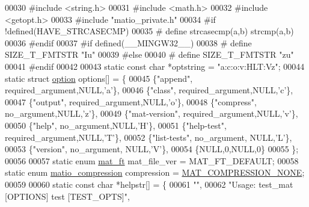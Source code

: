 \begin{DoxyCode}
00030 \textcolor{preprocessor}{#include <string.h>}
00031 \textcolor{preprocessor}{#include <math.h>}
00032 \textcolor{preprocessor}{#include <getopt.h>}
00033 \textcolor{preprocessor}{#include "matio\_private.h"}
00034 \textcolor{preprocessor}{#if !defined(HAVE\_STRCASECMP)}
00035 \textcolor{preprocessor}{#   define strcasecmp(a,b) strcmp(a,b)}
00036 \textcolor{preprocessor}{#endif}
00037 \textcolor{preprocessor}{#if defined(\_\_MINGW32\_\_)}
00038 \textcolor{preprocessor}{#   define SIZE\_T\_FMTSTR "Iu"}
00039 \textcolor{preprocessor}{#else}
00040 \textcolor{preprocessor}{#   define SIZE\_T\_FMTSTR "zu"}
00041 \textcolor{preprocessor}{#endif}
00042 
00043 \textcolor{keyword}{static} \textcolor{keyword}{const} \textcolor{keywordtype}{char} *optstring = \textcolor{stringliteral}{"a:c:o:v:HLT:Vz"};
00044 \textcolor{keyword}{static} \textcolor{keyword}{struct }\hyperlink{structoption}{option} options[] = \{
00045     \{\textcolor{stringliteral}{"append"},      required\_argument,NULL,\textcolor{charliteral}{'a'}\},
00046     \{\textcolor{stringliteral}{"class"},       required\_argument,NULL,\textcolor{charliteral}{'c'}\},
00047     \{\textcolor{stringliteral}{"output"},      required\_argument,NULL,\textcolor{charliteral}{'o'}\},
00048     \{\textcolor{stringliteral}{"compress"},    no\_argument,NULL,\textcolor{charliteral}{'z'}\},
00049     \{\textcolor{stringliteral}{"mat-version"}, required\_argument,NULL,\textcolor{charliteral}{'v'}\},
00050     \{\textcolor{stringliteral}{"help"},        no\_argument,NULL,\textcolor{charliteral}{'H'}\},
00051     \{\textcolor{stringliteral}{"help-test"},   required\_argument,NULL,\textcolor{charliteral}{'T'}\},
00052     \{\textcolor{stringliteral}{"list-tests"},  no\_argument,      NULL,\textcolor{charliteral}{'L'}\},
00053     \{\textcolor{stringliteral}{"version"},     no\_argument,      NULL,\textcolor{charliteral}{'V'}\},
00054     \{NULL,0,NULL,0\}
00055 \};
00056 
00057 \textcolor{keyword}{static} \textcolor{keyword}{enum} \hyperlink{group___m_a_t_gad03442b8378999189d510e3745c702b7}{mat\_ft}            mat\_file\_ver = MAT\_FT\_DEFAULT;
00058 \textcolor{keyword}{static} \textcolor{keyword}{enum} \hyperlink{group___m_a_t_ga768c318af97bd2567758ecb001ceb7f4}{matio\_compression} compression  = 
      \hyperlink{group___m_a_t_gga768c318af97bd2567758ecb001ceb7f4a2280b97631ff5dd24dec55261dc587b6}{MAT\_COMPRESSION\_NONE};
00059 
00060 \textcolor{keyword}{static} \textcolor{keyword}{const} \textcolor{keywordtype}{char} *helpstr[] = \{
00061     \textcolor{stringliteral}{""},
00062     \textcolor{stringliteral}{"Usage: test\_mat [OPTIONS] test [TEST\_OPTS]"},

\end{DoxyCode}
